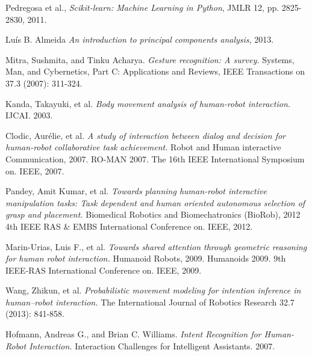 


%
%
%
\begin{thebibliography}{1}

Pedregosa et al., \emph{Scikit-learn: Machine Learning in Python},  JMLR 12, pp. 2825-2830, 2011.

Luís B. Almeida \emph{An introduction to principal components analysis}, 2013.

Mitra, Sushmita, and Tinku Acharya. \emph{Gesture recognition: A survey.} Systems, Man, and Cybernetics, Part C: Applications and Reviews, IEEE Transactions on 37.3 (2007): 311-324.

Kanda, Takayuki, et al. \emph{Body movement analysis of human-robot interaction.} IJCAI. 2003.

Clodic, Aurélie, et al. \emph{A study of interaction between dialog and decision for human-robot collaborative task achievement.} Robot and Human interactive Communication, 2007. RO-MAN 2007. The 16th IEEE International Symposium on. IEEE, 2007.

Pandey, Amit Kumar, et al. \emph{Towards planning human-robot interactive manipulation tasks: Task dependent and human oriented autonomous selection of grasp and placement.} Biomedical Robotics and Biomechatronics (BioRob), 2012 4th IEEE RAS \& EMBS International Conference on. IEEE, 2012.

Marin-Urias, Luis F., et al. \emph{Towards shared attention through geometric reasoning for human robot interaction.} Humanoid Robots, 2009. Humanoids 2009. 9th IEEE-RAS International Conference on. IEEE, 2009.

Wang, Zhikun, et al. \emph{Probabilistic movement modeling for intention inference in human–robot interaction.} The International Journal of Robotics Research 32.7 (2013): 841-858.

Hofmann, Andreas G., and Brian C. Williams. \emph{Intent Recognition for Human-Robot Interaction.} Interaction Challenges for Intelligent Assistants. 2007.

\end{thebibliography}
